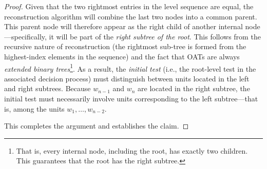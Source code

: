 \documentclass[12pt]{article}
\begin{document}
\begin{proof}
Given that the two rightmost entries in the level sequence are equal, the reconstruction algorithm will combine the last two nodes into a common parent. This parent node will therefore appear as the right child of another internal node---specifically, it will be part of the \emph{right subtree of the root}. This follows from the recursive nature of reconstruction {(the rightmost sub-tree is formed from the highest-index elements in the sequence) and the fact that} OATs are always \emph{extended binary trees}\footnote{That is, every internal node, including the root, has exactly two children. {This guarantees that the root has the right subtree.}}. As a result, the \emph{initial test} (i.e., the root-level test in the associated decision process) must distinguish between units located in the left and right subtrees. Because \( w_{n-1} \) and \( w_n \) are located in the right subtree, the initial test must necessarily involve units corresponding to the left subtree---that is, among the units \( w_1, \dots, w_{n-2} \).

This completes the argument and establishes the claim.
\end{proof}
\end{document}
